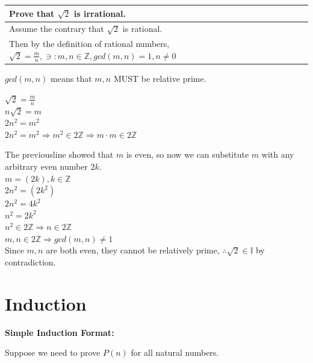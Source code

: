 \documentclass{article}
\begin{document}
\begin{center}
\begin{tabular}{l}
Prove that $\sqrt{2}$ is irrational.\\
\hline

Assume the contrary that $\sqrt{2}$ is rational.\\
Then by the definition of rational numbers, $\sqrt{2} = \frac{m}{n}, \ni: m ,n \in \mathbb Z, gcd(m,n) = 1, n \neq 0$\\
\end{tabular}

\end{center}

$gcd(m,n)$ means that $m,n$ MUST be relative prime.

\begin{center}

{\large
$\sqrt{2} = \frac{m}{n}$\\
$n\sqrt{2} = m$\\
$2n^2 = m^2$\\
$2n^2 = m^2 \Rightarrow m^2 \in 2 \mathbb Z \Rightarrow m \cdot m \in 2 \mathbb Z$\\}
\hrulefill

{\normalsize The previousline showed that $m$ is even, so now we can substitute $m$ with any arbitrary even number $2k$.\\}
{\large
$m = (2k), k \in \mathbb Z$\\
$2n^2 = (2k^2)$\\
$2n^2 = 4k^2$\\
$n^2 = 2k^2$\\
$n^2 \in 2 \mathbb Z \Rightarrow n \in 2 \mathbb Z$\\
$m, n \in 2 \mathbb Z \Rightarrow gcd(m,n) \neq 1$\\
}
Since $m, n$ are both even, they cannot be relatively prime,
$\therefore \sqrt{2} \in \mathbb I$ by contradiction. 

\end{center}

\pagebreak

\text{}

\section{Induction}

\textbf{Simple Induction Format:}

Suppose we need to prove $P(n)$ for all natural numbers.
\end{document}
